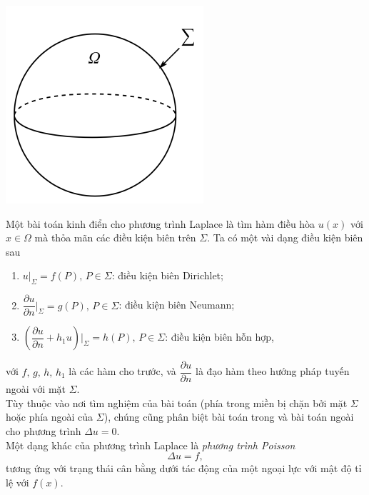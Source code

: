 \documentclass[10pt, a4paper]{article}
\begin{document}
	\begin{minipage}[c]{0.4\textwidth}
		\centering
		\includegraphics[width=0.6\linewidth]{ball.png}
	\end{minipage}\hfill
	\begin{minipage}[t]{0.5\textwidth}
		\raggedright
		\quad Một bài toán kinh điển cho phương trình Laplace là tìm hàm điều hòa $u(x)$ với $x\in\Omega$ mà thỏa mãn các điều kiện biên trên $\Sigma$. Ta có một vài dạng điều kiện biên sau
	\end{minipage}
	
	\begin{enumerate}
		\item $u\big|_\Sigma=f(P),\,P\in\Sigma$: điều kiện biên Dirichlet;
		\item $\dfrac{\partial u}{\partial n}\bigg|_\Sigma=g(P),\,P\in\Sigma$: điều kiện biên Neumann;
		\item $\left(\dfrac{\partial u}{\partial n}+h_1u\right)\bigg|_\Sigma=h(P),\,P\in\Sigma$: điều kiện biên hỗn hợp,
	\end{enumerate}
	với $f,\,g,\,h,\,h_1$ là các hàm cho trước, và $\dfrac{\partial u}{\partial n}$ là đạo hàm theo hướng pháp tuyến ngoài với mặt $\Sigma$.\\
	
	Tùy thuộc vào nơi tìm nghiệm của bài toán (phía trong miền bị chặn bởi mặt $\Sigma$ hoặc phía ngoài của $\Sigma$), chúng cũng phân biệt bài toán trong và bài toán ngoài cho phương trình $\Delta u=0$.\\
	
	Một dạng khác của phương trình Laplace là \textit{phương trình Poisson} $$\Delta u=f,$$
	tương ứng với trạng thái cân bằng dưới tác động của một ngoại lực với mật độ tỉ lệ với $f(x)$.\\
	
\end{document}
